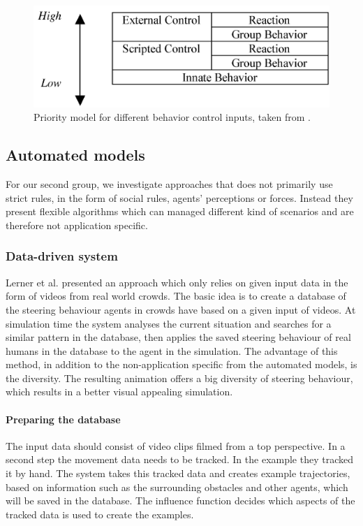 \documentclass{acmsiggraph}               %
\begin{document}
\begin{figure}[h]
  \centering
  \includegraphics[width=0.8\linewidth]{images/ViCrowdPriorityModel.png}
  \caption{Priority model for different behavior control inputs, taken from \protect\cite{musse_hierarchical_2001}.}
  \label{fig:viCrowdPriority}
\end{figure}

\subsection{Automated models}
\label{chap:automatedModels}
For our second group, we investigate approaches that does not primarily use strict rules, in the form of social rules, agents' perceptions or forces. Instead they present flexible algorithms which can managed different kind of scenarios and are therefore not application specific.    

\subsubsection{Data-driven system}
Lerner et al.  \label{exp:lerner_crowds_2007} presented an approach which only relies on given input data in the form of videos from real world crowds. The basic idea is to create a database of the steering behaviour agents in crowds have based on a given input of videos. At simulation time the system analyses the current situation and searches for a similar pattern in the database, then applies the saved steering behaviour of real humans in the database to the agent in the simulation. The advantage of this method, in addition to the non-application specific from the automated models, is the diversity. The resulting animation offers a big diversity of steering behaviour, which results in a better visual appealing simulation. 

\paragraph{Preparing the database}
The input data should consist of video clips filmed from a top perspective. In a second step the movement data needs to be tracked. In the example they tracked it by hand.
The system takes this tracked data and creates example trajectories, based on information such as the surrounding obstacles and other agents, which will be saved in the database. The influence function decides which aspects of the tracked data is used to create the examples. 
\end{document}

